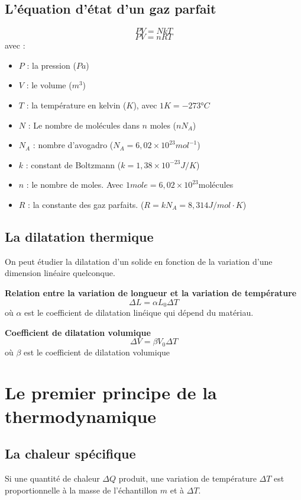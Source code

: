\documentclass{article}
\begin{document}
\subsection{L'équation d'état d'un gaz parfait}
\[PV = NkT\]
\[PV = nRT\]
avec :
\begin{itemize}
    \item $P$ : la pression ($Pa$)
    \item $V$ : le volume ($m^3$)
    \item $T$ : la température en kelvin ($K$), avec $1K = -273°C$
    \item $N$ : Le nombre de molécules dans $n$ moles ($nN_A$)
    \item $N_A$ : nombre d'avogadro ($N_A = 6,02\times10^{23}mol^{-1}$)
    \item $k$ : constant de Boltzmann ($k = 1,38\times10^{-23}J/K$)
    \item $n$ : le nombre de moles. Avec $1mole = 6,02\times 10^{23}$molécules
    \item $R$ : la constante des gaz parfaits. ($R = kN_A = 8,314J/mol\cdot K$)
\end{itemize}


\subsection{La dilatation thermique}
On peut étudier la dilatation d'un solide en fonction de la variation d'une dimension linéaire quelconque.
\newline

\noindent
\textbf{Relation entre la variation de longueur et la variation de température}
\[\Delta L = \alpha L_0\Delta T\]
où $\alpha$ est le coefficient de dilatation linéique qui dépend du matériau.
\newline

\noindent
\textbf{Coefficient de dilatation volumique}
\[\Delta V = \beta V_0 \Delta T\]
où $\beta$ est le coefficient de dilatation volumique



\section{Le premier principe de la thermodynamique}
\subsection{La chaleur spécifique}
Si une quantité de chaleur $\Delta Q$ produit, une variation de température $\Delta T$ est proportionnelle à la masse de l'échantillon $m$ et à $\Delta T$.
\newline
\end{document}
